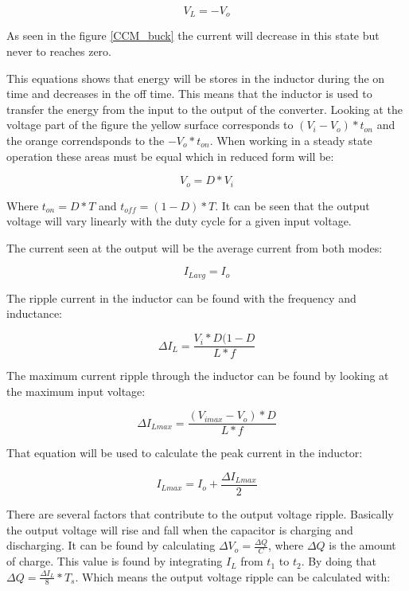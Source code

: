 \begin{equation}
V_L = -V_o
\end{equation} 

As seen in the figure \ref{CCM_buck} the current will decrease in this state but never to reaches zero.

This equations shows that energy will be stores in the inductor during the on time and decreases in the off time. This means that the inductor is used to transfer the energy from the input to the output of the converter. 
Looking at the voltage part of the figure the yellow surface corresponds to $(V_i-V_o)*t_{on}$ and the orange correndsponds to the $-V_o*t_{on}$. When working in a steady state operation these areas must be equal which in reduced form will be:

\begin{equation}
V_o = D*V_i
\end{equation}

Where $t_{on}=D*T$ and $t_{off}=(1-D)*T$. It can be seen that the output voltage will vary linearly with the duty cycle for a given input voltage.

The current seen at the output will be the average current from both modes:

\begin{equation}
I_{Lavg}=I_o
\end{equation}

The ripple current in the inductor can be found with the frequency and inductance:

\begin{equation}
\Delta I_L = \frac{V_i*D(1-D}{L*f}
\end{equation}

The maximum current ripple through the inductor can be found by looking at the maximum input voltage:

\begin{equation}
\Delta I_{Lmax} = \frac{(V_{imax}-V_{o})*D}{L*f}
\end{equation}

That equation will be used to calculate the peak current in the inductor:

\begin{equation}
I_{Lmax} = I_o + \frac{\Delta I_{Lmax}}{2}
\end{equation}

There are several factors that contribute to the output voltage ripple. Basically the output voltage will rise and fall when the capacitor is charging and discharging. It can be found by calculating $\Delta V_o = \frac{\Delta Q}{C}$, where $\Delta Q$ is the amount of charge. This value is found by integrating $I_L$ from $t_1$ to $t_2$. By doing that $\Delta Q = \frac{\Delta I_L}{8}*T_s$. Which means the output voltage ripple can be calculated with:
 
